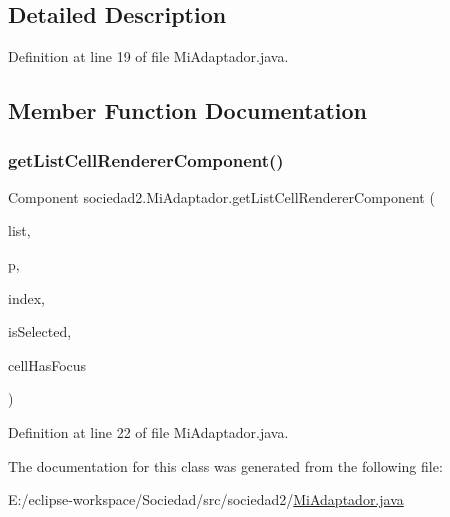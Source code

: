 \subsection{Detailed Description}


Definition at line 19 of file Mi\+Adaptador.\+java.



\subsection{Member Function Documentation}
\mbox{\label{classsociedad2_1_1_mi_adaptador_a27def0784983d566dabf88f07bbdd913}} 
\subsubsection{\texorpdfstring{get\+List\+Cell\+Renderer\+Component()}{getListCellRendererComponent()}}
{\footnotesize\ttfamily Component sociedad2.\+Mi\+Adaptador.\+get\+List\+Cell\+Renderer\+Component (\begin{DoxyParamCaption}\item[{J\+List$<$? extends \mbox{\hyperlink{classsociedad2_1_1_socio}{Socio}} $>$}]{list,  }\item[{\mbox{\hyperlink{classsociedad2_1_1_socio}{Socio}}}]{p,  }\item[{int}]{index,  }\item[{boolean}]{is\+Selected,  }\item[{boolean}]{cell\+Has\+Focus }\end{DoxyParamCaption})}



Definition at line 22 of file Mi\+Adaptador.\+java.



The documentation for this class was generated from the following file\+:\begin{DoxyCompactItemize}
\item 
E\+:/eclipse-\/workspace/\+Sociedad/src/sociedad2/\mbox{\hyperlink{_mi_adaptador_8java}{Mi\+Adaptador.\+java}}\end{DoxyCompactItemize}
